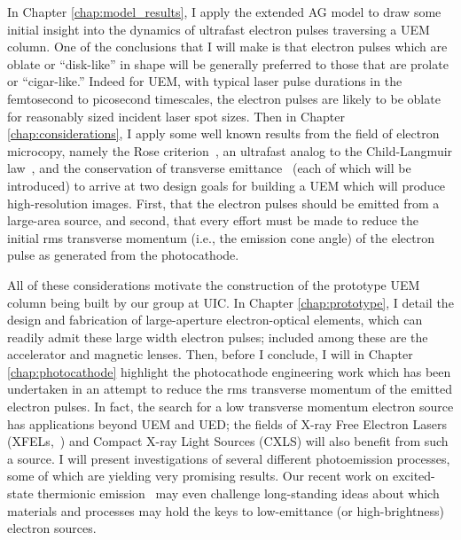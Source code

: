 In Chapter \ref{chap:model_results}, I apply the extended AG model to draw some initial insight into the dynamics of ultrafast electron pulses traversing a UEM column.
One of the conclusions that I will make is that electron pulses which are oblate or ``disk-like'' in shape will be generally preferred to those that are prolate or ``cigar-like.'' 
Indeed for UEM, with typical laser pulse durations in the femtosecond to picosecond timescales, the electron pulses are likely to be oblate for reasonably sized incident laser spot sizes.
Then in Chapter \ref{chap:considerations}, I apply some well known results from the field of electron microcopy, namely the Rose criterion~\cite{rose_television_1948}, an ultrafast analog to the Child-Langmuir law~\cite{child_discharge_1911,langmuir_effect_1923,valfells_effects_2002}, and the conservation of transverse emittance~\cite{jensen_emittance_2010} (each of which will be introduced) to arrive at two design goals for building a UEM which will produce high-resolution images.
First, that the electron pulses should be emitted from a large-area source, and second, that every effort must be made to reduce the initial rms transverse momentum (i.e., the emission cone angle) of the electron pulse as generated from the photocathode.

All of these considerations motivate the construction of the prototype UEM column being built by our group at UIC.
In Chapter \ref{chap:prototype}, I detail the design and fabrication of large-aperture electron-optical elements, which can readily admit these large width electron pulses; included among these are the accelerator and magnetic lenses.
Then, before I conclude, I will in Chapter \ref{chap:photocathode} highlight the photocathode engineering work which has been undertaken in an attempt to reduce the rms transverse momentum of the emitted electron pulses.
In fact, the search for a low transverse momentum electron source has applications beyond UEM and UED; the fields of X-ray Free Electron Lasers (XFELs,~\cite{nemeth_high_2010}) and Compact X-ray Light Sources (CXLS) \cite{cxls_workshop_report_2012} will also benefit from such a source.
I will present investigations of several different photoemission processes, some of which are yielding very promising results.
Our recent work on excited-state thermionic emission~\cite{berger_excited_2012} may even challenge long-standing ideas about which materials and processes may hold the keys to low-emittance (or high-brightness) electron sources.

